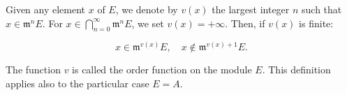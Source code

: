 Given any element $x$ of $E$, we denote by $v(x)$ the largest integer $n$ such that $x \in \mathfrak{m}^n E$. For $x \in \bigcap_{n=0}^{\infty} \mathfrak{m}^n E$, we set $v(x) = +\infty$. Then, if $v(x)$ is finite:

$$x \in \mathfrak{m}^{v(x)} E, \quad x \notin \mathfrak{m}^{v(x)+1} E.$$

The function $v$ is called the order function on the module $E$. This definition applies also to the particular case $E = A$.